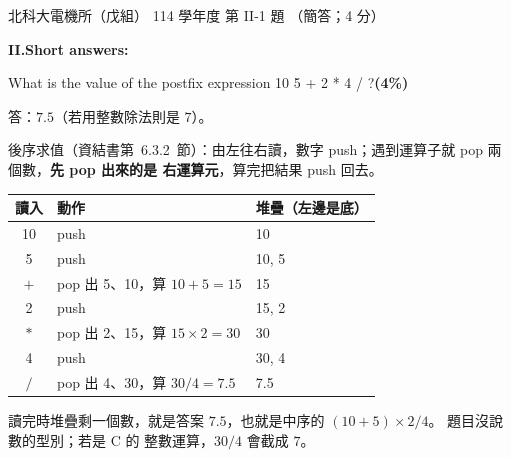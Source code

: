 \begin{pastexam}[label={px:ntut-114-ee-ds-05}]{北科大電機所（戊組） 114 學年度 第 II-1 題}
（簡答；4 分）

\textbf{II.\quad Short answers:}

What is the value of the postfix expression 10 5 + 2 * 4 / ?\textbf{(4\%)}
\end{pastexam}

\begin{pastsoln}
答：$7.5$（若用整數除法則是 $7$）。

後序求值（資結書第~6.3.2~節）：由左往右讀，數字 push；遇到運算子就 pop 兩個數，\textbf{先 pop 出來的是
右運算元}，算完把結果 push 回去。
\begin{center}
\small
\begin{tabular}{cll}
\toprule
讀入 & 動作 & 堆疊（左邊是底） \\
\midrule
10 & push & 10 \\
5 & push & 10, 5 \\
$+$ & pop 出 5、10，算 $10 + 5 = 15$ & 15 \\
2 & push & 15, 2 \\
$*$ & pop 出 2、15，算 $15 \times 2 = 30$ & 30 \\
4 & push & 30, 4 \\
$/$ & pop 出 4、30，算 $30 / 4 = 7.5$ & 7.5 \\
\bottomrule
\end{tabular}
\end{center}
讀完時堆疊剩一個數，就是答案 $7.5$，也就是中序的 $(10 + 5) \times 2 / 4$。 題目沒說數的型別；若是 C 的
整數運算，$30 / 4$ 會截成 $7$。
\end{pastsoln}

